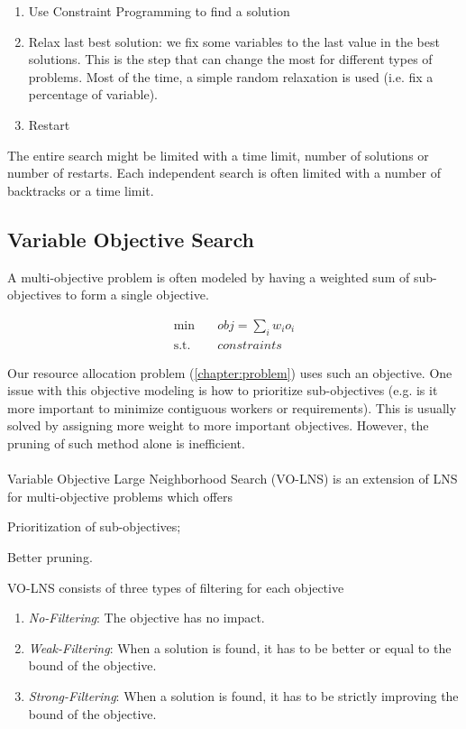 \documentclass[../../thesis.tex]{subfiles}
\begin{document}
\begin{enumerate}
  \item Use Constraint Programming to find a solution 
  \item Relax last best solution: we fix some variables to the last value in the best solutions. This is the 
        step that can change the most for different types of problems. Most of the time, a simple random relaxation is used (i.e. fix a percentage of variable).
  \item Restart
\end{enumerate}

The entire search might be limited with a time limit, number of solutions or number of restarts. Each independent search 
is often limited with a number of backtracks or a time limit.

\subsection{Variable Objective Search}

A multi-objective problem is often modeled by having a weighted sum of sub-objectives to form a 
single objective. 

\begin{align*}
  \text{min} \quad & obj = \sum_{i} w_i o_i \\
  \text{s.t.} \quad & constraints
\end{align*}

Our resource allocation problem (\ref{chapter:problem}) uses such an objective. One issue with this objective modeling is how 
to prioritize sub-objectives (e.g. is it more important to minimize contiguous workers or requirements). This is 
usually solved by assigning more weight to more important objectives. However, the pruning of such method alone is inefficient.

\paragraph{}

Variable Objective Large Neighborhood Search (VO-LNS) \cite{Schaus:VOLNS} is an extension of LNS for multi-objective 
problems which offers
\begin{enumerate*}[label=(\roman*)]
  \item Prioritization of sub-objectives;
  \item Better pruning.
\end{enumerate*}
VO-LNS consists of three types of filtering for each objective
\begin{enumerate}
  \item \emph{No-Filtering}: The objective has no impact.
  \item \emph{Weak-Filtering}: When a solution is found, it has to be better or equal to the bound of the objective. 
  \item \emph{Strong-Filtering}: When a solution is found, it has to be strictly improving the bound of the objective.
\end{enumerate}
\end{document}
